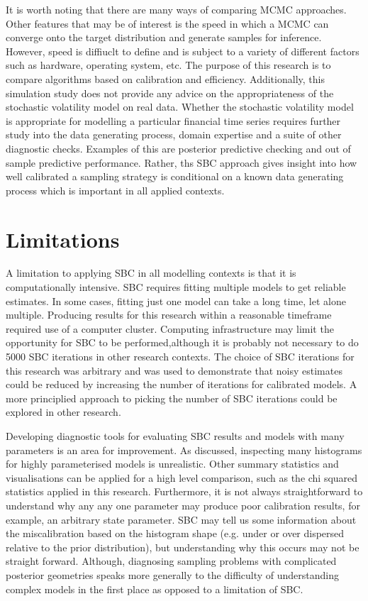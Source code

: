 \documentclass[12pt, a4paper]{article}
\begin{document}
It is worth noting that there are many ways of comparing MCMC approaches. Other features that may be of interest is the speed in which a MCMC can converge onto the target distribution and generate samples for inference. However, speed is diffiuclt to define and is subject to a variety of different factors such as hardware, operating system, etc. The purpose of this research is to compare algorithms based on calibration and efficiency. Additionally, this simulation study does not provide any advice on the appropriateness of the stochastic volatility model on real data. Whether the stochastic volatility model is appropriate for modelling a particular financial time series requires further study into the data generating process, domain expertise and a suite of other diagnostic checks. Examples of this are posterior predictive checking and out of sample predictive performance. Rather, ths SBC approach gives insight into how well calibrated a sampling strategy is conditional on a known data generating process which is important in all applied contexts.  


\section{Limitations}
A limitation to applying SBC in all modelling contexts is that it is computationally intensive. SBC requires fitting multiple models to get reliable estimates. In some cases, fitting just one model can take a long time, let alone multiple. Producing results for this research within a reasonable timeframe required use of a computer cluster. Computing infrastructure may limit the opportunity for SBC to be performed,although it is probably not necessary to do 5000 SBC iterations in other research contexts. The choice of SBC iterations for this research was arbitrary and was used to demonstrate that noisy estimates could be reduced by increasing the number of iterations for calibrated models. A more principlied approach to picking the number of SBC iterations could be explored in other research.

Developing diagnostic tools for evaluating SBC results and models with many parameters is an area for improvement. As discussed, inspecting many histograms for highly parameterised models is unrealistic. Other summary statistics and visualisations can be applied for a high level comparison, such as the chi squared statistics applied in this research. Furthermore, it is not always straightforward to understand why any any one parameter may produce poor calibration results, for example, an arbitrary state parameter. SBC may tell us some information about the miscalibration based on the histogram shape (e.g. under or over dispersed relative to the prior distribution), but understanding why this occurs may not be straight forward. Although, diagnosing sampling problems with complicated posterior geometries speaks more generally to the difficulty of understanding complex models in the first place as opposed to a limitation of SBC.
\end{document}
